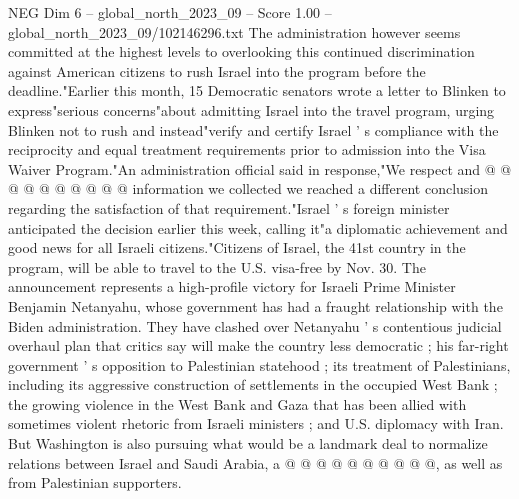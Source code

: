 \begin{textsample}{NEG Dim 6 – global\_north\_2023\_09 – Score 1.00 – global\_north\_2023\_09/102146296.txt}
The administration however seems committed at the highest levels to overlooking this continued discrimination against American citizens to rush Israel into the program before the deadline."Earlier this month, 15 Democratic senators wrote a letter to Blinken to express"serious concerns"about admitting Israel into the travel program, urging Blinken not to rush and instead"verify and certify Israel ' s compliance with the reciprocity and equal treatment requirements prior to admission into the Visa Waiver Program."An administration official said in response,"We respect and @ @ @ @ @ @ @ @ @ @ information we collected we reached a different conclusion regarding the satisfaction of that requirement."Israel ' s foreign minister anticipated the decision earlier this week, calling it"a diplomatic achievement and good news for all Israeli citizens."Citizens of Israel, the 41st country in the program, will be able to travel to the U.S. visa-free by Nov. 30.
The announcement represents a high-profile victory for Israeli Prime Minister Benjamin Netanyahu, whose government has had a fraught relationship with the Biden administration.
They have clashed over Netanyahu ' s contentious judicial overhaul plan that critics say will make the country less democratic ; his far-right government ' s opposition to Palestinian statehood ; its treatment of Palestinians, including its aggressive construction of settlements in the occupied West Bank ; the growing violence in the West Bank and Gaza that has been allied with sometimes violent rhetoric from Israeli ministers ; and U.S. diplomacy with Iran.
But Washington is also pursuing what would be a landmark deal to normalize relations between Israel and Saudi Arabia, a @ @ @ @ @ @ @ @ @ @, as well as from Palestinian supporters.

\end{textsample}
